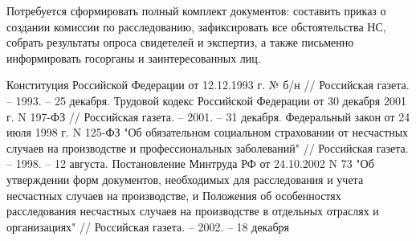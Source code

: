 Потребуется сформировать полный комплект документов: составить приказ о создании комиссии по расследованию, зафиксировать все обстоятельства НС, собрать результаты опроса свидетелей и экспертиз, а также письменно информировать госорганы и заинтересованных лиц.

\begin{thebibliography}{4}
    Конституция Российской Федерации от 12.12.1993 г. № б/н // Российская газета. – 1993. – 25 декабря.
    Трудовой кодекс Российской Федерации от 30 декабря 2001 г. N 197-ФЗ // Российская газета. – 2001. – 31 декабря.
    Федеральный закон от 24 июля 1998 г. N 125-ФЗ "Об обязательном социальном страховании от несчастных случаев на производстве и профессиональных заболеваний" // Российская газета. – 1998. – 12 августа.
    Постановление Минтруда РФ от 24.10.2002 N 73 "Об утверждении форм документов, необходимых для расследования и учета несчастных случаев на производстве, и Положения об особенностях расследования несчастных случаев на производстве в отдельных отраслях и организациях" // Российская газета. – 2002. – 18 декабря
\end{thebibliography}
